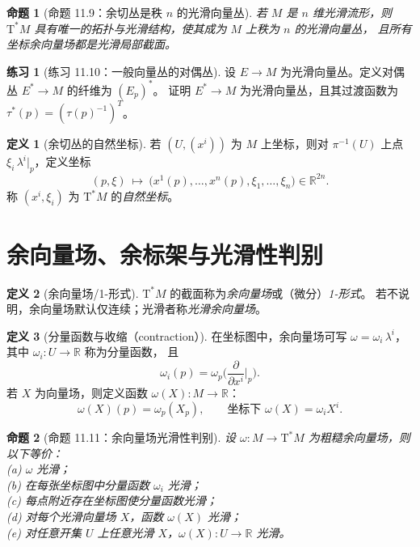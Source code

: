 \documentclass[12pt,a4paper]{article}
\theoremstyle{definition}
\newtheorem{definition}{定义}[section]
\newtheorem{exercise}{练习}[section]
\theoremstyle{plain}
\newtheorem{proposition}{命题}[section]
\newcommand{\R}{\mathbb{R}}
\newcommand{\Tstar}{\mathrm{T}^{*}}
\begin{document}
\begin{proposition}[命题 11.9：余切丛是秩 $n$ 的光滑向量丛]
若 $M$ 是 $n$ 维光滑流形，则 $\Tstar M$ 具有唯一的拓扑与光滑结构，使其成为 $M$ 上秩为 $n$ 的光滑向量丛，
且所有坐标余向量场都是光滑局部截面。
\end{proposition}

\begin{exercise}[练习 11.10：一般向量丛的对偶丛]
设 $E\to M$ 为光滑向量丛。定义对偶丛 $E^*\to M$ 的纤维为 $(E_p)^*$。
证明 $E^*\to M$ 为光滑向量丛，且其过渡函数为 $\tau^*(p)=(\tau(p)^{-1})^T$。
\end{exercise}

\begin{definition}[余切丛的自然坐标]
若 $(U,(x^i))$ 为 $M$ 上坐标，则对 $\pi^{-1}(U)$ 上点 $\xi_i\,\lambda^i|_p$，定义坐标
\[
(p,\xi)\ \longmapsto\ \big(x^1(p),\dots,x^n(p),\xi_1,\dots,\xi_n\big)\in \R^{2n}.
\]
称 $(x^i,\xi_i)$ 为 $\Tstar M$ 的\emph{自然坐标}。
\end{definition}

\section{余向量场、余标架与光滑性判别}

\begin{definition}[余向量场/1-形式]
$\Tstar M$ 的截面称为\emph{余向量场}或（微分）\emph{1-形式}。
若不说明，余向量场默认仅连续；光滑者称\emph{光滑余向量场}。
\end{definition}

\begin{definition}[分量函数与收缩（contraction）]
在坐标图中，余向量场可写 $\omega=\omega_i\,\lambda^i$，其中 $\omega_i:U\to\R$ 称为分量函数，
且
\[
\omega_i(p)=\omega_p\Big(\frac{\partial}{\partial x^i}\Big|_p\Big).
\]
若 $X$ 为向量场，则定义函数 $\omega(X):M\to\R$：
\[
\omega(X)(p)=\omega_p(X_p),\qquad \text{坐标下 } \omega(X)=\omega_iX^i.
\]
\end{definition}

\begin{proposition}[命题 11.11：余向量场光滑性判别]
设 $\omega:M\to \Tstar M$ 为粗糙余向量场，则以下等价：\\
(a) $\omega$ 光滑；\\
(b) 在每张坐标图中分量函数 $\omega_i$ 光滑；\\
(c) 每点附近存在坐标图使分量函数光滑；\\
(d) 对每个光滑向量场 $X$，函数 $\omega(X)$ 光滑；\\
(e) 对任意开集 $U$ 上任意光滑 $X$，$\omega(X):U\to\R$ 光滑。
\end{proposition}
\end{document}
